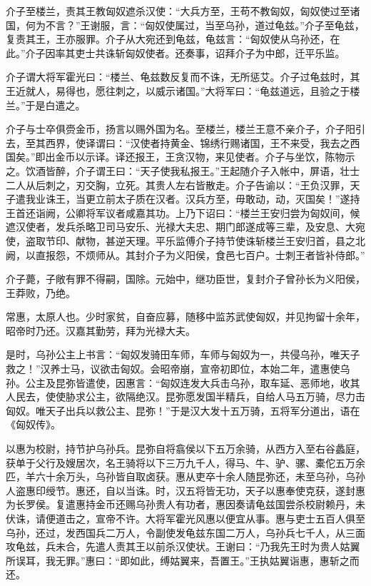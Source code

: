 \documentclass[12pt,UTF8]{ctexbook}
\begin{document}
介子至楼兰，责其王教匈奴遮杀汉使：“大兵方至，王苟不教匈奴，匈奴使过至诸国，何为不言？”王谢服，言：“匈奴使属过，当至乌孙，道过龟兹。”介子至龟兹，复责其王，王亦服罪。介子从大宛还到龟兹，龟兹言：“匈奴使从乌孙还，在此。”介子因率其吏士共诛斩匈奴使者。还奏事，诏拜介子为中郎，迁平乐监。



介子谓大将军霍光曰：“楼兰、龟兹数反复而不诛，无所惩艾。介子过龟兹时，其王近就人，易得也，愿往刺之，以威示诸国。”大将军曰：“龟兹道远，且验之于楼兰。”于是白遣之。



介子与士卒俱赍金币，扬言以赐外国为名。至楼兰，楼兰王意不亲介子，介子阳引去，至其西界，使译谓曰：“汉使者持黄金、锦绣行赐诸国，王不来受，我去之西国矣。”即出金币以示译。译还报王，王贪汉物，来见使者。介子与坐饮，陈物示之。饮酒皆醉，介子谓王曰：“天子使我私报王。”王起随介子入帐中，屏语，壮士二人从后刺之，刃交胸，立死。其贵人左右皆散走。介子告谕以：“王负汉罪，天子遣我业诛王，当更立前太子质在汉者。汉兵方至，毋敢动，动，灭国矣！”遂持王首还诣阙，公卿将军议者咸嘉其功。上乃下诏曰：“楼兰王安归尝为匈奴间，候遮汉使者，发兵杀略卫司马安乐、光禄大夫忠、期门郎遂成等三辈，及安息、大宛使，盗取节印、献物，甚逆天理。平乐监傅介子持节使诛斩楼兰王安归首，县之北阙，以直报怨，不烦师从。其封介子为义阳侯，食邑七百户。士刺王者皆补侍郎。”



介子薨，子敞有罪不得嗣，国除。元始中，继功臣世，复封介子曾孙长为义阳侯，王莽败，乃绝。



常惠，太原人也。少时家贫，自奋应募，随移中监苏武使匈奴，并见拘留十余年，昭帝时乃还。汉嘉其勤劳，拜为光禄大夫。



是时，乌孙公主上书言：“匈奴发骑田车师，车师与匈奴为一，共侵乌孙，唯天子救之！”汉养士马，议欲击匈奴。会昭帝崩，宣帝初即位，本始二年，遣惠使乌孙。公主及昆弥皆遣使，因惠言：“匈奴连发大兵击乌孙，取车延、恶师地，收其人民去，使使胁求公主，欲隔绝汉。昆弥愿发国半精兵，自给人马五万骑，尽力击匈奴。唯天子出兵以救公主、昆弥！”于是汉大发十五万骑，五将军分道出，语在《匈奴传》。



以惠为校尉，持节护乌孙兵。昆弥自将翕侯以下五万余骑，从西方入至右谷蠡庭，获单于父行及嫂居次，名王骑将以下三万九千人，得马、牛、驴、骡、橐佗五万余匹，羊六十余万头，乌孙皆自取卤获。惠从吏卒十余人随昆弥还，未至乌孙，乌孙人盗惠印绶节。惠还，自以当诛。时，汉五将皆无功，天子以惠奉使克获，遂封惠为长罗侯。复遣惠持金币还赐乌孙贵人有功者，惠因奏请龟兹国尝杀校尉赖丹，未伏诛，请便道击之，宣帝不许。大将军霍光风惠以便宜从事。惠与吏士五百人俱至乌孙，还过，发西国兵二万人，令副使发龟兹东国二万人，乌孙兵七千人，从三面攻龟兹，兵未合，先遣人责其王以前杀汉使状。王谢曰：“乃我先王时为贵人姑翼所误耳，我无罪。”惠曰：“即如此，缚姑翼来，吾置王。”王执姑翼诣惠，惠斩之而还。
\end{document}
